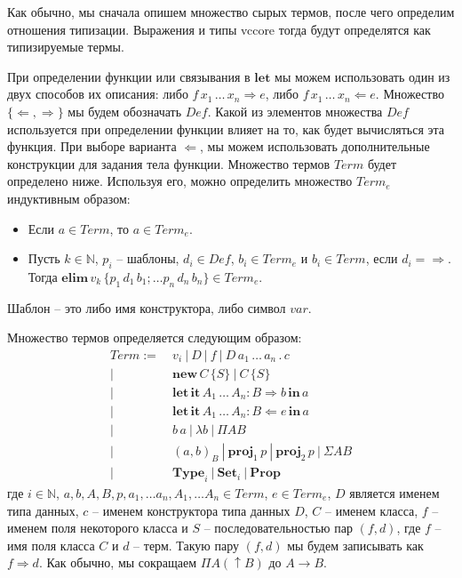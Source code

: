 \documentclass{amsart}
\theoremstyle{definition}
\theoremstyle{remark}
\newcommand{\red}{\Rightarrow}
\numberwithin{figure}{section}
\begin{document}
Как обычно, мы сначала опишем множество сырых термов, после чего определим отношения типизации.
Выражения и типы vccore тогда будут определятся как типизируемые термы.

При определении функции или связывания в $\mathbf{let}$ мы можем использовать один из двух способов их описания: либо $f\,x_1\,\ldots\,x_n \Rightarrow e$, либо $f\,x_1\,\ldots\,x_n \Leftarrow e$.
Множество $\{ \Leftarrow, \Rightarrow \}$ мы будем обозначать $Def$.
Какой из элементов множества $Def$ используется при определении функции влияет на то, как будет вычисляться эта функция.
При выборе варианта $\Leftarrow$, мы можем использовать дополнительные конструкции для задания тела функции.
Множество термов $Term$ будет определено ниже.
Используя его, можно определить множество $Term_e$ индуктивным образом:
\begin{itemize}
\item Если $a \in Term$, то $a \in Term_e$.
\item Пусть $k \in \mathbb{N}$, $p_i$ -- шаблоны, $d_i \in Def$, $b_i \in Term_e$ и $b_i \in Term$, если $d_i = \Rightarrow$.
    Тогда $\mathbf{elim}\,v_k\,\{ p_1\,d_1\,b_1; \ldots p_n\,d_n\,b_n \} \in Term_e$.
\end{itemize}
Шаблон -- это либо имя конструктора, либо символ $var$.

Множество термов определяется следующим образом:
\begin{align*}
Term :=\ & v_i\ |\ D\ |\ f\ |\ D\,a_1\,\ldots\,a_n\,.\,c \\
      |\ & \mathbf{new}\,C\,\{ S \}\ |\ C\,\{ S \} \\
      |\ & \mathbf{let}\,\mathbf{it}\,A_1\,\ldots\,A_n : B \Rightarrow b\,\mathbf{in}\,a \\
      |\ & \mathbf{let}\,\mathbf{it}\,A_1\,\ldots\,A_n : B \Leftarrow e\,\mathbf{in}\,a \\
      |\ & b\,a\ |\ \lambda b\ |\ \Pi A B \\
      |\ & (a,b)_B\ |\ \mathbf{proj}_1\,p\ |\ \mathbf{proj}_2\,p\ |\ \Sigma A B \\
      |\ & \mathbf{Type}_i\ |\ \mathbf{Set}_i\ |\ \mathbf{Prop}
\end{align*}
где $i \in \mathbb{N}$, $a, b, A, B, p, a_1, \ldots a_n, A_1, \ldots A_n \in Term$, $e \in Term_e$, $D$ является именем типа данных, $c$ -- именем конструктора типа данных $D$, $C$ -- именем класса, $f$ -- именем поля некоторого класса и $S$ -- последовательностью пар $(f,d)$, где $f$ -- имя поля класса $C$ и $d$ -- терм.
Такую пару $(f,d)$ мы будем записывать как $f \red d$.
Как обычно, мы сокращаем $\Pi A (\uparrow B)$ до $A \to B$.
\end{document}
